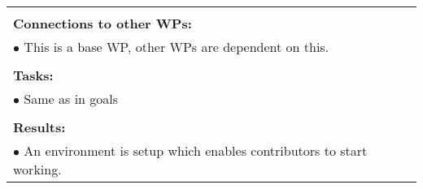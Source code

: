 \begin{table}[!h]
\begin{center}
\begin{tabular}{|p{}||p{}|p{}||p{}|}
            \multicolumn{4}{|p{.95\columnwidth}|}{}\\
            \multicolumn{4}{|p{.95\columnwidth}|}{\textbf{Connections to other WPs:}}\\
            \multicolumn{4}{|p{.95\columnwidth}|}{$\bullet$ This is a base WP, other WPs are dependent on this.}\\
            \multicolumn{4}{|p{.95\columnwidth}|}{}\\
            \multicolumn{4}{|p{.95\columnwidth}|}{\textbf{Tasks:}}\\
            \multicolumn{4}{|p{.95\columnwidth}|}{$\bullet$ Same as in goals}\\
            \multicolumn{4}{|p{.95\columnwidth}|}{}\\
            \multicolumn{4}{|p{.95\columnwidth}|}{\textbf{Results:}}\\
            \multicolumn{4}{|p{.95\columnwidth}|}{$\bullet$ An environment is setup which enables contributors to start working.}\\
            \hline
        \end{tabular}
    \end{center}
\end{table}

\clearpage

